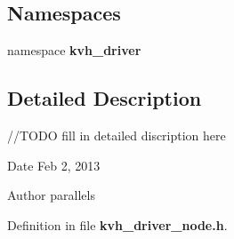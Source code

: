 \subsection*{\-Namespaces}
\begin{DoxyCompactItemize}
\item 
namespace {\bf kvh\-\_\-driver}
\end{DoxyCompactItemize}


\subsection{\-Detailed \-Description}
//\-T\-O\-D\-O fill in detailed discription here \begin{DoxyDate}{\-Date}
\-Feb 2, 2013 
\end{DoxyDate}
\begin{DoxyAuthor}{\-Author}
parallels 
\end{DoxyAuthor}


\-Definition in file {\bf kvh\-\_\-driver\-\_\-node.\-h}.

